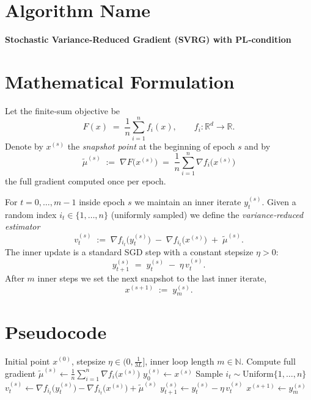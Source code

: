 \documentclass{article}
\newcommand{\RR}{\mathbb{R}}
\begin{document}
\section*{Algorithm Name}
\textbf{Stochastic Variance‑Reduced Gradient (SVRG) with PL‑condition}

\section*{Mathematical Formulation}
Let the finite‑sum objective be
\[
F(x)\;=\;\frac{1}{n}\sum_{i=1}^{n}f_i(x),\qquad f_i:\RR^d\to\RR .
\]
Denote by $x^{(s)}$ the \emph{snapshot point} at the beginning of epoch $s$ and by
\[
\tilde{\mu}^{(s)}\;:=\;\nabla F\!\big(x^{(s)}\big)
   \;=\;\frac{1}{n}\sum_{i=1}^{n}\nabla f_i\big(x^{(s)}\big)
\]
the full gradient computed once per epoch.  

For $t=0,\dots,m-1$ inside epoch $s$ we maintain an inner iterate $y_t^{(s)}$.
Given a random index $i_t\!\in\!\{1,\dots,n\}$ (uniformly sampled) we define the
\emph{variance‑reduced estimator}
\[
v_t^{(s)} \;:=\;
\nabla f_{i_t}\!\big(y_t^{(s)}\big)
\;-\;
\nabla f_{i_t}\!\big(x^{(s)}\big)
\;+\;
\tilde{\mu}^{(s)} .
\tag{1}
\]
The inner update is a standard SGD step with a constant stepsize $\eta>0$:
\[
y_{t+1}^{(s)} \;=\; y_t^{(s)} \;-\; \eta\, v_t^{(s)} .
\tag{2}
\]
After $m$ inner steps we set the next snapshot to the last inner iterate,
\[
x^{(s+1)} \;:=\; y_{m}^{(s)} .
\tag{3}
\]

\section*{Pseudocode}
\begin{algorithm}[H]
\caption{SVRG under PL and $L$‑smoothness}
\label{alg:svrg}
\begin{algorithmic}[1]
\REQUIRE Initial point $x^{(0)}$, stepsize $\eta\in(0,\frac{1}{3L}]$, inner loop length $m\in\mathbb N$.
    \STATE Compute full gradient $\displaystyle \tilde{\mu}^{(s)}\gets \frac{1}{n}\sum_{i=1}^{n}\nabla f_i\big(x^{(s)}\big)$
    \STATE $y^{(s)}_0 \gets x^{(s)}$
        \STATE Sample $i_t\sim\text{Uniform}\{1,\dots,n\}$
        \STATE $v^{(s)}_t \gets \nabla f_{i_t}\!\big(y^{(s)}_t\big)-\nabla f_{i_t}\!\big(x^{(s)}\big)+\tilde{\mu}^{(s)}$
        \STATE $y^{(s)}_{t+1} \gets y^{(s)}_{t}-\eta\,v^{(s)}_{t}$
    \ENDFOR
    \STATE $x^{(s+1)} \gets y^{(s)}_{m}$
\ENDFOR
\end{algorithmic}
\end{algorithm}
\end{document}
